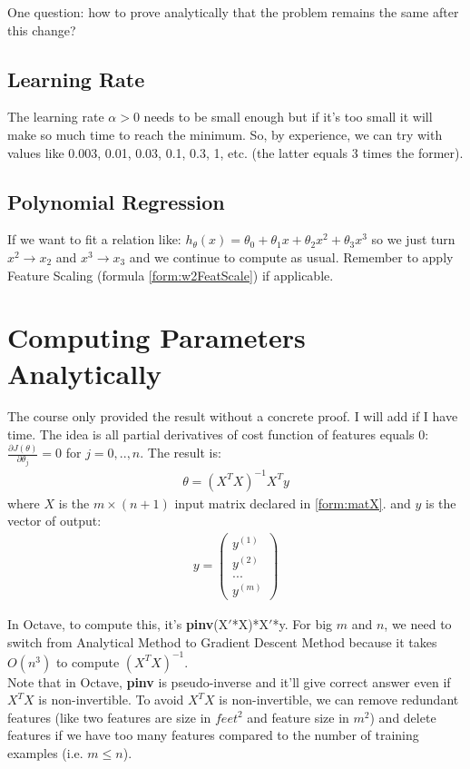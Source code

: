 One question: how to prove analytically that the problem remains the same after this change?

\subsection{Learning Rate}
The learning rate $\alpha > 0$ needs to be small enough but if it's too small it will make so much time to reach the minimum. So, by experience, we can try with values like 0.003, 0.01, 0.03, 0.1, 0.3, 1, etc. (the latter equals 3 times the former).

\subsection{Polynomial Regression}
If we want to fit a relation like: $h_\theta(x) = \theta_0 + \theta_1 x + \theta_2 x^2 + \theta_3 x^3 $ so we just turn $x^2 \rightarrow x_2$ and $x^3 \rightarrow x_3$ and we continue to compute as usual. Remember to apply Feature Scaling (formula \eqref{form:w2FeatScale}) if applicable.

\section{Computing Parameters Analytically}
The course only provided the result without a concrete proof. I will add if I have time. The idea is all partial derivatives of cost function of features equals 0: $\frac{\partial J(\theta)}{\partial \theta_j} = 0$ for $j=0,..,n$. The result is:
\begin{align} \label{form:paraAna}
\theta = (X^T X)^{-1}X^Ty
\end{align}
where $X$ is the $m \times (n+1)$ input matrix declared in \eqref{form:matX}.
and $y$ is the vector of output:
\begin{align}
y = \begin{pmatrix} \label{form:matY}
y^{(1)} \\
y^{(2)} \\
... \\
y^{(m)}
\end{pmatrix}
\end{align}

In Octave, to compute this, it's \textbf{pinv}(X$'$*X)*X$'$*y. For big $m$ and $n$, we need to switch from Analytical Method to Gradient Descent Method because it takes $O(n^3)$ to compute $(X^TX)^{-1}$. \\
Note that in Octave, \textbf{pinv} is pseudo-inverse and it'll give correct answer even if $X^TX$ is non-invertible. To avoid $X^TX$ is non-invertible, we can remove redundant features (like two features are size in $feet^2$ and feature size in $m^2$) and delete features if we have too many features compared to the number of training examples (i.e. $m \leq n$). 

